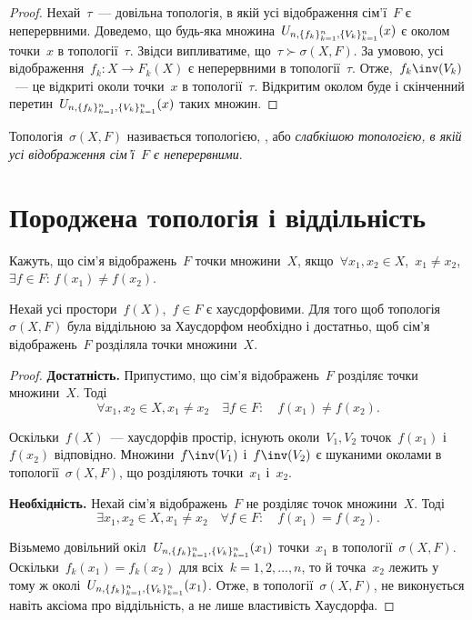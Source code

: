 \begin{proof}
    Нехай~$\tau$~--- довільна топологія, в якій усі відображення сім'ї~$F$ є неперервними. Доведемо, що будь-яка множина~$U_{n,\{f_k\}_{k=1}^n,\{V_k\}_{k=1}^n}(x)$ є околом точки~$x$ в топології~$\tau$. Звідси випливатиме, що~$\tau \succ \sigma(X, F)$. За умовою, усі відображення~$f_k: X \to F_k(X)$ є неперервними в топології~$\tau$. Отже,~$f_k\inv(V_k)$~--- це відкриті околи точки~$x$ в топології~$\tau$. Відкритим околом буде і скінченний перетин~$U_{n,\{f_k\}_{k=1}^n,\{V_k\}_{k=1}^n}(x)$ таких множин.
\end{proof}

\begin{definition}
    Топологія~$\sigma(X, F)$ називається топологією, , або \emph{слабкішою топологією, в якій усі відображення сім'ї~$F$ є неперервними}.
\end{definition}

\section{Породжена топологія і віддільність}

\begin{definition}
    Кажуть, що сім'я відображень~$F$  точки множини~$X$, якщо~$\forall x_1, x_2 \in X$,~$x_1 \ne x_2$,~$\exists f \in F$: $f(x_1) \ne f(x_2)$.
\end{definition}

\begin{theorem}
    \label{th:induced-topology-hausdorff-separability-criterion}
    Нехай усі простори~$f(X)$,~$f \in F$ є хаусдорфовими. Для того щоб топологія~$\sigma(X, F)$ була віддільною за Хаусдорфом необхідно і достатньо, щоб сім'я відображень~$F$ розділяла точки множини~$X$.
\end{theorem}

\begin{proof}
    \textbf{Достатність.} Припустимо, що сім'я відображень~$F$ розділяє точки множини~$X$. Тоді
    \begin{equation*}
        \forall x_1, x_2 \in X, x_1 \ne x_2 \quad \exists f \in F: \quad f(x_1) \ne f(x_2).
    \end{equation*}

    Оскільки~$f(X)$~--- хаусдорфів простір, існують околи~$V_1, V_2$ точок~$f(x_1)$ і~$f(x_2)$ відповідно. Множини~$f\inv(V_1)$ і~$f\inv(V_2)$ є шуканими околами в топології~$\sigma(X, F)$, що розділяють точки~$x_1$ і~$x_2$.

    \textbf{Необхідність.} Нехай сім'я відображень~$F$ не розділяє точок множини~$X$. Тоді
    \begin{equation*}
        \exists x_1, x_2 \in X, x_1 \ne x_2 \quad \forall f \in F: \quad f(x_1) = f(x_2).
    \end{equation*}

    Візьмемо довільний окіл~$U_{n,\{f_k\}_{k=1}^n,\{V_k\}_{k=1}^n}(x_1)$ точки~$x_1$ в топології~$\sigma(X, F)$. Оскільки~$f_k(x_1) = f_k(x_2)$ для всіх~$k = 1, 2, \dots, n$, то й точка~$x_2$ лежить у тому ж околі~$U_{n,\{f_k\}_{k=1}^n,\{V_k\}_{k=1}^n}(x_1)$. Отже, в топології~$\sigma(X, F)$, не виконується навіть аксіома про віддільність, а не лише властивість Хаусдорфа.
\end{proof}

